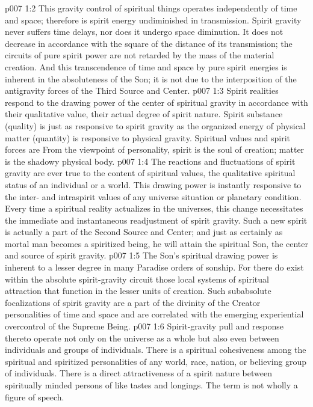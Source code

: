 \vs p007 1:2 This gravity control of spiritual things operates independently of time and space; therefore is spirit energy undiminished in transmission. Spirit gravity never suffers time delays, nor does it undergo space diminution. It does not decrease in accordance with the square of the distance of its transmission; the circuits of pure spirit power are not retarded by the mass of the material creation. And this transcendence of time and space by pure spirit energies is inherent in the absoluteness of the Son; it is not due to the interposition of the antigravity forces of the Third Source and Center.
\vs p007 1:3 Spirit realities respond to the drawing power of the center of spiritual gravity in accordance with their qualitative value, their actual degree of spirit nature. Spirit substance (quality) is just as responsive to spirit gravity as the organized energy of physical matter (quantity) is responsive to physical gravity. Spiritual values and spirit forces are  From the viewpoint of personality, spirit is the soul of creation; matter is the shadowy physical body.
\vs p007 1:4 The reactions and fluctuations of spirit gravity are ever true to the content of spiritual values, the qualitative spiritual status of an individual or a world. This drawing power is instantly responsive to the inter\hyp{} and intraspirit values of any universe situation or planetary condition. Every time a spiritual reality actualizes in the universes, this change necessitates the immediate and instantaneous readjustment of spirit gravity. Such a new spirit is actually a part of the Second Source and Center; and just as certainly as mortal man becomes a spiritized being, he will attain the spiritual Son, the center and source of spirit gravity.
\vs p007 1:5 \pc The Son’s spiritual drawing power is inherent to a lesser degree in many Paradise orders of sonship. For there do exist within the absolute spirit\hyp{}gravity circuit those local systems of spiritual attraction that function in the lesser units of creation. Such subabsolute focalizations of spirit gravity are a part of the divinity of the Creator personalities of time and space and are correlated with the emerging experiential overcontrol of the Supreme Being.
\vs p007 1:6 Spirit\hyp{}gravity pull and response thereto operate not only on the universe as a whole but also even between individuals and groups of individuals. There is a spiritual cohesiveness among the spiritual and spiritized personalities of any world, race, nation, or believing group of individuals. There is a direct attractiveness of a spirit nature between spiritually minded persons of like tastes and longings. The term  is not wholly a figure of speech.
